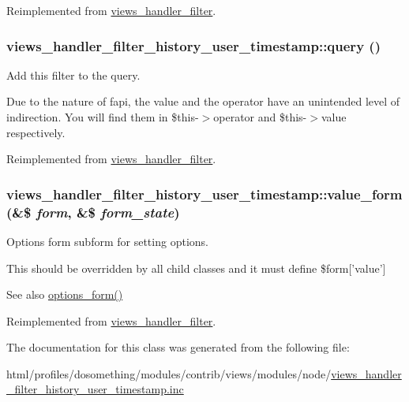 Reimplemented from \hyperlink{classviews__handler__filter_a9537c9a30fb9008361efdfdde46633cd}{views\_\-handler\_\-filter}.\hypertarget{classviews__handler__filter__history__user__timestamp_ac7499e60ca61853a3cd37fcbaa3c0618}{
\subsubsection[{query}]{\setlength{\rightskip}{0pt plus 5cm}views\_\-handler\_\-filter\_\-history\_\-user\_\-timestamp::query ()}}
\label{classviews__handler__filter__history__user__timestamp_ac7499e60ca61853a3cd37fcbaa3c0618}
Add this filter to the query.

Due to the nature of fapi, the value and the operator have an unintended level of indirection. You will find them in \$this-\/$>$operator and \$this-\/$>$value respectively. 

Reimplemented from \hyperlink{classviews__handler__filter_a8e513b3abbc2559f37b550ca4957b4ae}{views\_\-handler\_\-filter}.\hypertarget{classviews__handler__filter__history__user__timestamp_a38401d36304bef8a19184a8e7919427f}{
\subsubsection[{value\_\-form}]{\setlength{\rightskip}{0pt plus 5cm}views\_\-handler\_\-filter\_\-history\_\-user\_\-timestamp::value\_\-form (\&\$ {\em form}, \/  \&\$ {\em form\_\-state})}}
\label{classviews__handler__filter__history__user__timestamp_a38401d36304bef8a19184a8e7919427f}
Options form subform for setting options.

This should be overridden by all child classes and it must define \$form\mbox{[}'value'\mbox{]}

\begin{DoxySeeAlso}{See also}
\hyperlink{classviews__handler__filter_af14c69367162057a32709a6340de0988}{options\_\-form()} 
\end{DoxySeeAlso}


Reimplemented from \hyperlink{classviews__handler__filter_a9168b39edae84b20e01a3fd0d810ba66}{views\_\-handler\_\-filter}.

The documentation for this class was generated from the following file:\begin{DoxyCompactItemize}
\item 
html/profiles/dosomething/modules/contrib/views/modules/node/\hyperlink{views__handler__filter__history__user__timestamp_8inc}{views\_\-handler\_\-filter\_\-history\_\-user\_\-timestamp.inc}\end{DoxyCompactItemize}
